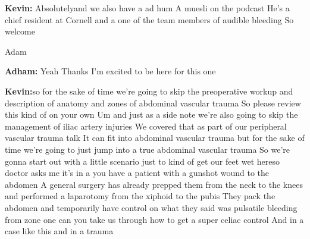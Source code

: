 \documentclass[
]{book}
\begin{document}
\textbf{Kevin:} Absolutelyand we also have a ad hum A muesli on the podcast
He's a chief resident at Cornell and a one of the team members of
audible bleeding So welcome

Adam

\textbf{Adham:} Yeah Thanks I'm excited to be here for this one

\textbf{Kevin:}so for the sake of time we're going to skip the preoperative
workup and description of anatomy and zones of abdominal vascular trauma
So please review this kind of on your own Um and just as a side note
we're also going to skip the management of iliac artery injuries We
covered that as part of our peripheral vascular trauma talk It can fit
into abdominal vascular trauma but for the sake of time we're going to
just jump into a true abdominal vascular trauma So we're gonna start out
with a little scenario just to kind of get our feet wet hereso doctor
asks me it's in a you have a patient with a gunshot wound to the abdomen
A general surgery has already prepped them from the neck to the knees
and performed a laparotomy from the xiphoid to the pubis They pack the
abdomen and temporarily have control on what they said was pulsatile
bleeding from zone one can you take us through how to get a super celiac
control And in a case like this and in a trauma
\end{document}
